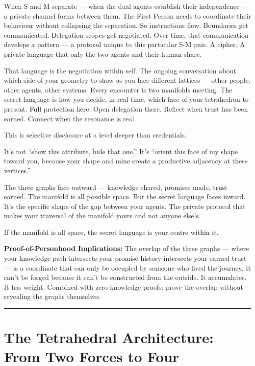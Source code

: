 \documentclass[
]{article}
\begin{document}
When S and M separate --- when the dual agents establish their
independence --- a private channel forms between them. The First Person
needs to coordinate their behaviour without collapsing the separation.
So instructions flow. Boundaries get communicated. Delegation scopes get
negotiated. Over time, that communication develops a pattern --- a
protocol unique to this particular S-M pair. A cipher. A private
language that only the two agents and their human share.

That language is the negotiation within self. The ongoing conversation
about which side of your geometry to show as you face different lattices
--- other people, other agents, other systems. Every encounter is two
manifolds meeting. The secret language is how you decide, in real time,
which face of your tetrahedron to present. Full protection here. Open
delegation there. Reflect when trust has been earned. Connect when the
resonance is real.

This is selective disclosure at a level deeper than credentials.

It's not ``show this attribute, hide that one.'' It's ``orient this face
of my shape toward you, because your shape and mine create a productive
adjacency at these vertices.''

The three graphs face outward --- knowledge shared, promises made, trust
earned. The manifold is all possible space. But the secret language
faces inward. It's the specific shape of the gap between your agents.
The private protocol that makes your traversal of the manifold yours and
not anyone else's.

If the manifold is all space, the secret language is your centre within
it.

\textbf{Proof-of-Personhood Implications:} The overlap of the three
graphs --- where your knowledge path intersects your promise history
intersects your earned trust --- is a coordinate that can only be
occupied by someone who lived the journey. It can't be forged because it
can't be constructed from the outside. It accumulates. It has weight.
Combined with zero-knowledge proofs: prove the overlap without revealing
the graphs themselves.

\begin{center}\rule{0.5\linewidth}{0.5pt}\end{center}

\section{The Tetrahedral Architecture: From Two Forces to
Four}\label{the-tetrahedral-architecture-from-two-forces-to-four}
\end{document}
